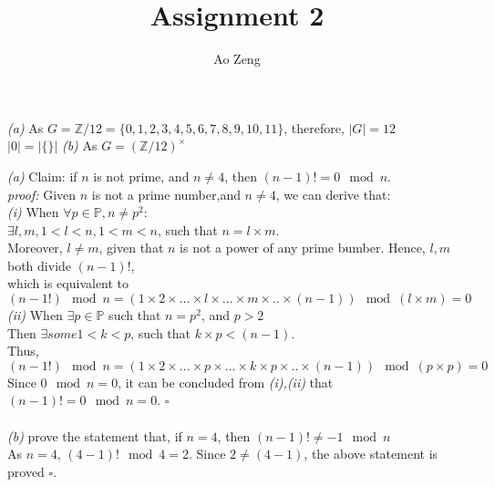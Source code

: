 \documentclass[11pt]{article}
\newcommand{\abs}[1]{\lvert #1 \rvert}
\newenvironment{problem}[2][Problem]{\begin{trivlist}
\item[\hskip \labelsep {\bfseries #1}\hskip \labelsep {\bfseries #2.}]}{\end{trivlist}}
\begin{document}
\title{Assignment 2}
\author{Ao Zeng}
\maketitle
\begin{problem}{1}
\textit{(a)} As $G = \mathbb{Z} / 12 = \{ 0,1,2,3,4,5,6,7,8,9,10,11 \}$, therefore, $\abs{G} = 12$\\
$\abs{0} = \abs{ \{ \}}$
\textit{(b)} As $G = (\mathbb{Z}/12)^{\times} $
\end{problem}

\begin{problem}{2}
\textit{(a)}  Claim: if $n$ is not prime, and $n\neq 4$, then $(n-1)! = 0 \mod n$.\\
\textit{proof:} Given $n$ is not a prime number,and $n\neq 4$, we can derive that:\\
\textit{(i)} When $\forall p \in \mathbb{P}, n\neq p^2$:\\
 $\exists l,m, 1<l<n, 1<m<n$, such that $ n = l \times m$.\\
Moreover, $l\neq m$, given that $n$ is not a power of any prime bumber.
Hence, $l, m$ both divide $(n-1)!$,\\
which is equivalent to $( n-1!) \mod n = (1\times 2 \times ... \times l \times ... \times m \times .. \times (n-1)) \mod (l \times m) = 0 $\\
\textit{(ii)} When $\exists p \in \mathbb{P}$ such that $n = p^2$, and $p>2$\\
Then $\exists some 1<k<p$, such that $k\times p <(n-1)$.\\
Thus, $( n-1!) \mod n = (1\times 2 \times ... \times p \times ... \times k\times p \times .. \times (n-1)) \mod (p \times p) = 0 $\\
Since $0 \mod n = 0$, it can be concluded from \textit{(i),(ii)} that $(n-1)! = 0 \mod n = 0$. $\square$\\
\\
\textit{(b)} prove the statement that, if $n = 4$, then $(n-1)!\neq -1 \mod n$\\
As $n = 4$, $(4-1)! \mod 4 = 2$. Since $2\neq (4-1)$, the above statement is proved $\square$.\\
\end{problem}
\end{document}
